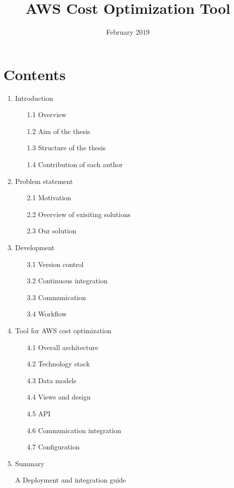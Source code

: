\documentclass[licencjacka,en]{thesisclass}
\title{AWS Cost Optimization Tool}
\date{February 2019}
\begin{document}
    \maketitle

    \begin{abstract}
        
    \end{abstract}

    \chapter*{Contents}

    \begin{enumerate}
        \item Introduction
        \begin{enumerate}
            \item [1.1] Overview
            \item [1.2] Aim of the thesis
            \item [1.3] Structure of the thesis
            \item [1.4] Contribution of each author
        \end{enumerate}
        \item Problem statement
        \begin{enumerate}
            \item [2.1] Motivation
            \item [2.2] Overview of exisiting solutions
            \item [2.3] Our solution
        \end{enumerate}
        \item Development
        \begin{enumerate}
            \item [3.1] Version control
            \item [3.2] Continuous integration
            \item [3.3] Communication
            \item [3.4] Workflow
        \end{enumerate}
        \item Tool for AWS cost optimization
        \begin{enumerate}
            \item [4.1] Overall architecture
            \item [4.2] Technology stack
            \item [4.3] Data models
            \item [4.4] Views and design
            \item [4.5] API
            \item [4.6] Communication integration
            \item [4.7] Configuration
        \end{enumerate}
        \item Summary
        \item [A] Deployment and integration guide
    \end{enumerate}
\end{document}
